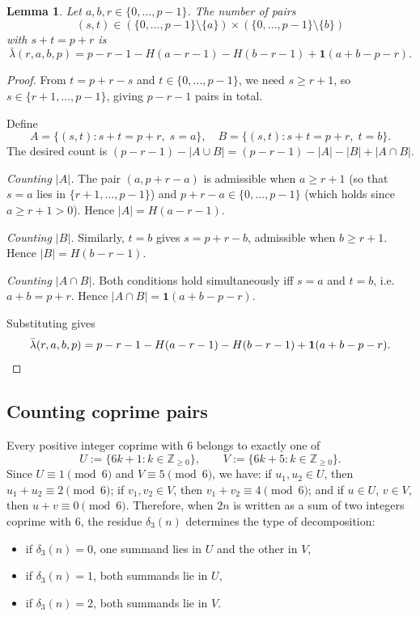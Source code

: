 \documentclass[12pt]{article}
\newtheorem{lemma}[theorem]{Lemma}
\begin{document}
\begin{lemma}\label{lem:lambda_p}
Let $a,b,r \in \{0,\dots,p-1\}$.
The number of pairs
\[
(s,t)
\in
(\{0,\dots,p-1\}\setminus\{a\})
\times
(\{0,\dots,p-1\}\setminus\{b\})
\]
with $s+t=p+r$ is
\[
\bar{\lambda}(r,a,b,p)
=
p-r-1-H(a-r-1)-H(b-r-1)+\mathbf{1}(a+b-p-r).
\]
\end{lemma}

\begin{proof}
From $t = p+r-s$ and $t \in \{0,\dots,p-1\}$, we need $s \ge r+1$,
so $s \in \{r+1,\dots,p-1\}$, giving $p-r-1$ pairs in total.

Define
\[
A = \{(s,t): s+t=p+r,\; s=a\},
\quad
B = \{(s,t): s+t=p+r,\; t=b\}.
\]
The desired count is $(p-r-1) - |A \cup B|
= (p-r-1) - |A| - |B| + |A \cap B|$.

\textit{Counting $|A|$.}
The pair $(a, p+r-a)$ is admissible when $a \ge r+1$
(so that $s=a$ lies in $\{r+1,\dots,p-1\}$) and
$p+r-a \in \{0,\dots,p-1\}$ (which holds since $a \ge r+1 > 0$).
Hence $|A| = H(a-r-1)$.

\textit{Counting $|B|$.}
Similarly, $t=b$ gives $s = p+r-b$, admissible when $b \ge r+1$.
Hence $|B| = H(b-r-1)$.

\textit{Counting $|A \cap B|$.}
Both conditions hold simultaneously iff $s=a$ and $t=b$,
i.e.\ $a+b = p+r$.
Hence $|A \cap B| = \mathbf{1}(a+b-p-r)$.

Substituting gives
\[
\bar{\lambda}(r,a,b,p)
= p-r-1-H(a-r-1)-H(b-r-1)+\mathbf{1}(a+b-p-r). \qedhere
\]
\end{proof}



\subsection{Counting coprime pairs}
\label{subsec:coprime_pairs}

Every positive integer coprime with $6$ belongs to exactly one of
\begin{equation}\label{eq:conjuntoUV}
U := \{6k+1 : k \in \mathbb{Z}_{\ge 0}\},
\qquad
V := \{6k+5 : k \in \mathbb{Z}_{\ge 0}\}.
\end{equation}
Since $U \equiv 1 \pmod{6}$ and $V \equiv 5 \pmod{6}$, we have:
if $u_1,u_2\in U$, then $u_1+u_2\equiv 2\pmod{6}$; if $v_1,v_2\in V$,
then $v_1+v_2\equiv 4\pmod{6}$; and if $u\in U$, $v\in V$, then
$u+v\equiv 0\pmod{6}$.
Therefore, when $2n$ is written as a sum of two integers coprime with $6$,
the residue $\delta_3(n)$ determines the type of decomposition:
\begin{itemize}
\item if $\delta_3(n)=0$, one summand lies in $U$ and the other in $V$,
\item if $\delta_3(n)=1$, both summands lie in $U$,
\item if $\delta_3(n)=2$, both summands lie in $V$.
\end{itemize}
\end{document}
